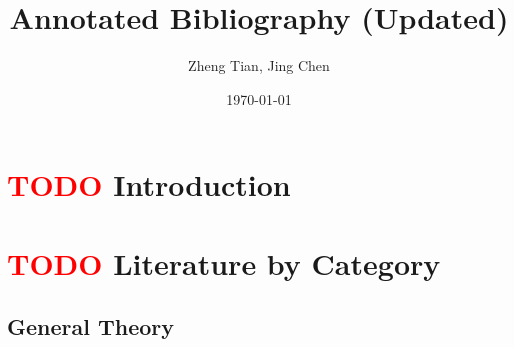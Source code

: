 \documentclass[a4paper,11pt]{article}
\author{Zheng Tian, Jing Chen}
\date{\today}
\title{Annotated Bibliography (Updated)}
\begin{document}
\maketitle


\section{\textcolor{red}{TODO} Introduction}
 \label{introduction}
 
\section{\textcolor{red}{TODO} Literature by Category}
\label{lit_category}

\subsection{General Theory}
\end{document}
